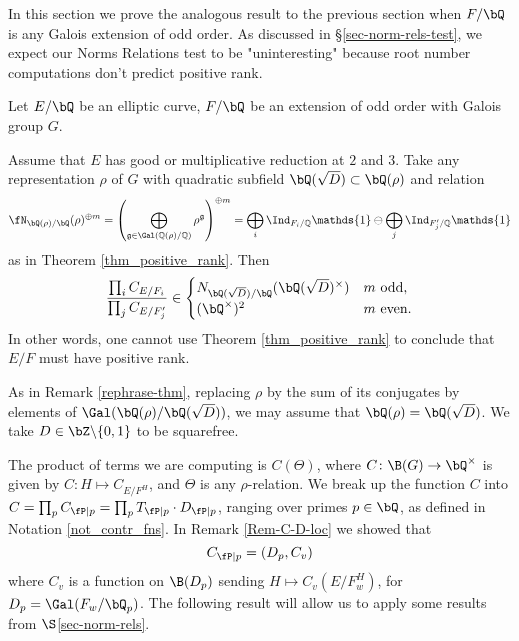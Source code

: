 
In this section we prove the analogous result to the previous section when $F / \bQ$ is any Galois extension of odd order. As discussed in \S\ref{sec-norm-rels-test}, we expect our Norms Relations test to be "uninteresting"  because root number computations don't predict positive rank.  

\begin{thm}\label{odd-exts}
 Let $E / \bQ$ be an elliptic curve, $F / \bQ$ be an extension of odd order with Galois group $G$. 
 
Assume that $E$ has good or multiplicative reduction at $2$ and $3$. 
Take any representation $\rho$ of $G$ with quadratic subfield $\bQ(\sqrt{D}) \subset \bQ(\rho)$ and relation
\begin{equation*}\label{odd-exp} \repnorm{\rho}^{\oplus m} =
 \left(\bigoplus_{\mathfrak{g}\in\Gal(\QQ(\rho)/\QQ)}\rho^{\mathfrak{g}}\right)^{\oplus m }=\bigoplus_i\Ind_{F_i/\QQ}\mathds{1}\ominus\bigoplus_j\Ind_{F'_j/\QQ}\mathds{1}
\end{equation*}
 as in Theorem \ref{thm_positive_rank}. Then
 \[ \frac{\prod_i C_{E/F_i}}{\prod_j C_{E/F_j'}}  \in 
    \begin{cases}
        N_{\bQ(\sqrt{D}) / \bQ}(\bQ(\sqrt{D})^{\times}) & m \ \text{odd}, \\
        (\bQ^{\times})^2 & m \ \text{even}.
    \end{cases} \] 
    In other words, one cannot use Theorem \ref{thm_positive_rank} to conclude that $E / F$ must have positive rank. 
\end{thm}

As in Remark \ref{rephrase-thm}, replacing $\rho$ by the sum of its conjugates by elements of $ \Gal(\bQ(\rho) / \bQ(\sqrt{D}))$, we may assume that $\bQ(\rho) = \bQ(\sqrt{D})$. We take $D \in \bZ \backslash \{0,1 \}$ to be squarefree.

The product of terms we are computing is $C(\Theta)$, where $C \colon \B(G) \to \bQ^{\times}$ is given by $C \colon H \mapsto C_{E / F^H}$, and $\Theta$ is any $\rho$-relation.
We break up the function $C$ into $C = \prod_p C_{\fP \mid p} = \prod_p T_{\fP \mid p} \cdot D_{\fP \mid p}$, ranging over primes $p \in \bQ$,
as defined in Notation \ref{not_contr_fns}.
In Remark \ref{Rem-C-D-loc} we showed that
\begin{equation*}%
C_{\fP \mid p} = (D_p, C_v)
\end{equation*}
where $C_v$ is a function on $\B(D_p)$ sending $H \mapsto C_v(E / F_w^H)$, for $D_p = \Gal(F_w / \bQ_p)$. The following result will allow us to apply some results from $\S$\ref{sec-norm-rels}.

